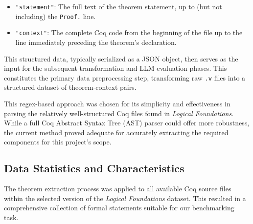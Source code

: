 \begin{enumerate}
\begin{itemize}
        \item \texttt{"statement"}: The full text of the theorem statement, up to (but not including) the \texttt{Proof.} line.
        \item \texttt{"context"}: The complete Coq code from the beginning of the file up to the line immediately preceding the theorem's declaration.
    \end{itemize}
    This structured data, typically serialized as a JSON object, then serves as the input for the subsequent transformation and LLM evaluation phases. This constitutes the primary data preprocessing step, transforming raw \texttt{.v} files into a structured dataset of theorem-context pairs.
\end{enumerate}

This regex-based approach was chosen for its simplicity and effectiveness in parsing the relatively well-structured Coq files found in \emph{Logical Foundations}. While a full Coq Abstract Syntax Tree (AST) parser could offer more robustness, the current method proved adequate for accurately extracting the required components for this project's scope.

\subsection{Data Statistics and Characteristics}
\label{sec:data_statistics}

The theorem extraction process was applied to all available Coq source files within the selected version of the \emph{Logical Foundations} dataset. This resulted in a comprehensive collection of formal statements suitable for our benchmarking task.

